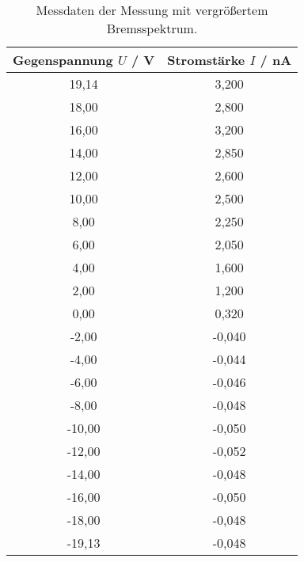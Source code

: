 \begin{table}[!htp]
\centering
\caption{Messdaten der Messung mit vergrößertem Bremsspektrum.}
\label{tab:messung2}
\begin{tabular}{c c}
\toprule
{Gegenspannung $U$ / V} & {Stromstärke $I$ / nA } \\
\midrule
19,14 & 3,200 \\
18,00 & 2,800 \\
16,00 & 3,200 \\
14,00 & 2,850 \\
12,00 & 2,600 \\
10,00 & 2,500 \\
8,00 & 2,250 \\
6,00 & 2,050 \\
4,00 & 1,600 \\
2,00 & 1,200 \\
0,00 & 0,320 \\
-2,00 & -0,040 \\
-4,00 & -0,044 \\
-6,00 & -0,046 \\
-8,00 & -0,048 \\
-10,00 & -0,050 \\
-12,00 & -0,052 \\
-14,00 & -0,048 \\
-16,00 & -0,050 \\
-18,00 & -0,048 \\
-19,13 & -0,048 \\
\bottomrule
\end{tabular}
\end{table}